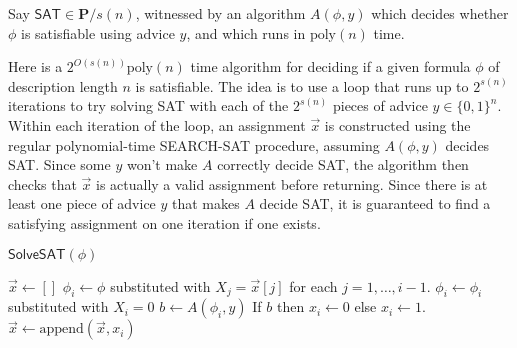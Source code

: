 \documentclass{article}
\renewcommand{\P}{\mathbf{P}}
\def \poly{\text{poly}}
\begin{document}
Say $\textsf{SAT} \in \P/s(n)$, witnessed by an algorithm $A(\phi, y)$ which decides whether $\phi$ is satisfiable using advice $y$, and which runs in $\poly(n)$ time.

Here is a $2^{O(s(n))} \poly(n)$ time algorithm for deciding if a given formula $\phi$ of description length $n$ is satisfiable.
The idea is to use a loop that runs up to $2^{s(n)}$ iterations to try solving SAT with each of the $2^{s(n)}$ pieces of advice $y \in \{0, 1\}^n$.
Within each iteration of the loop, an assignment $\vec{x}$ is constructed using the regular polynomial-time SEARCH-SAT procedure, assuming $A(\phi, y)$ decides SAT.
Since some $y$ won't make $A$ correctly decide SAT, the algorithm then checks that $\vec{x}$ is actually a valid assignment before returning.
Since there is at least one piece of advice $y$ that makes $A$ decide SAT, it is guaranteed to find a satisfying assignment on one iteration if one exists.

\begin{algorithm}{$\mathsf{SolveSAT}(\phi)$}
\begin{algorithmic}[1]
		\STATE $\vec{x} \gets []$
			\STATE $\phi_i \gets \phi$ substituted with $X_j = \vec{x}[j]$ for each $j= 1, \dots, i-1$.
			\STATE $\phi_i \gets \phi_i$ substituted with $X_i = 0$
			\STATE $b \gets A(\phi_i, y)$
			\STATE If $b$ then $x_i \gets 0$ else $x_i \gets 1$.
			\STATE $\vec{x} \gets \text{append}(\vec{x}, x_i)$
		\ENDFOR
			 
		\ENDIF
	\ENDFOR
\end{algorithmic}
\end{algorithm}





\end{document}
